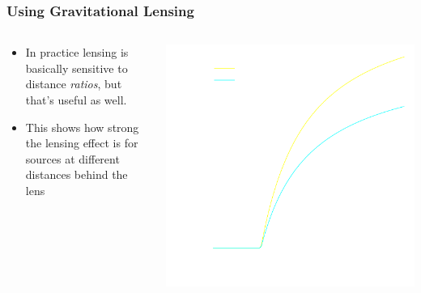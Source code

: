 \documentclass{beamer}
\begin{document}
{\begin{columns}
\begin{column}{0.5\textwidth}
            
        \end{column}
    \end{columns}


}

\frame
{

    \frametitle{Using Gravitational Lensing}


    \begin{columns}
        \begin{column}{0.5\textwidth}
            \begin{itemize}

                \item In practice lensing is basically sensitive to distance
                    {\em ratios}, but that's useful as well.

                \item This shows how strong the lensing effect is for
                    sources at different distances behind the lens

            \end{itemize}
        \end{column}
        \begin{column}{0.5\textwidth}
            \begin{center}
                \includegraphics[width=\textwidth]{scinv-example-invert.pdf}
            \end{center}

            
        \end{column}
    \end{columns}


}
\end{document}

